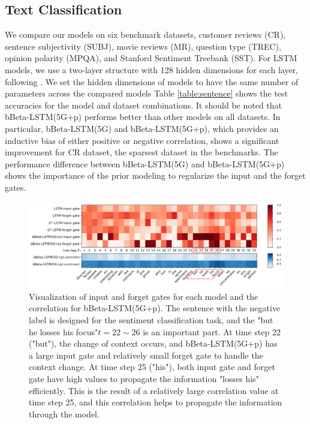 \documentclass[letterpaper]{article} %
\begin{document}
\subsection{Text Classification}
We compare our models on six benchmark datasets, customer reviews (CR), sentence subjectivity (SUBJ), movie reviews (MR), question type (TREC), opinion polarity (MPQA), and Stanford Sentiment Treebank (SST). For LSTM models, we use a two-layer structure with 128 hidden dimensions for each layer, following \cite{sru}. We set the hidden dimensions of models to have the same number of parameters across the compared models 
%
Table \ref{table:sentence} shows the test accuracies for the model and dataset combinations. 
It should be noted that bBeta-LSTM(5G+p) performs better than other models on all datasets. In particular, bBeta-LSTM(5G) and bBeta-LSTM(5G+p), which provides an inductive bias of either positive or negative correlation, shows a significant improvement for CR dataset, the sparsest dataset in the benchmarks.
The performance difference between bBeta-LSTM(5G) and bBeta-LSTM(5G+p) shows the importance of the prior modeling to regularize the input and the forget gates.
%
\begin{figure}[t!] %
	\centering
	\includegraphics[width=\linewidth]{mr_1467_case.png}
	\caption{Visualization of input and forget gates for each model and the correlation for bBeta-LSTM(5G+p). The sentence with the negative label is designed for the sentiment classification task, and the "but he losses his focus"$t=22 \sim 26$ is an important part. At time step 22 ("but"), the change of context occurs, and bBeta-LSTM(5G+p) has a large input gate and relatively small forget gate to handle the context change. At time step 25 ("his"), both input gate and forget gate have high values to propagate the information "losses his" efficiently. This is the result of a relatively large correlation value at time step 25, and this correlation helps to propagate the information through the model.
	}
	\label{fig:case_study}
\end{figure}
\end{document}
